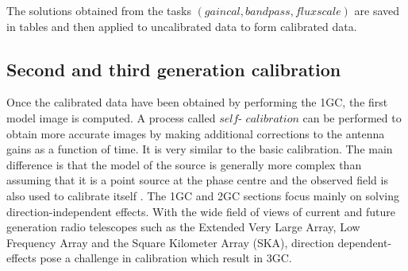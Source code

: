The solutions obtained from the tasks $(\textit{gaincal}, \textit{bandpass}, \textit{fluxscale})$ are saved in tables and then applied to uncalibrated data 
to form calibrated data.

\subsection{Second and third generation calibration}

Once the calibrated data have been obtained by performing the 1GC, the first model image is computed. A process called $\textit{self- calibration}$ can be performed to obtain more accurate images by making additional corrections to the antenna gains as a function of time. It is very similar to the basic calibration. The main difference is that the model of the source is generally more complex than assuming that it is a point source at the phase centre and the observed field is also used to calibrate itself \citep{wieringa1992investigation}. The 1GC and 2GC sections focus mainly on solving direction-independent effects. With the wide field of views of current and future generation radio telescopes such as the Extended Very Large Array, Low Frequency Array and the Square Kilometer Array (SKA), direction dependent-effects pose a challenge in calibration which result in 3GC.
%
%
%


